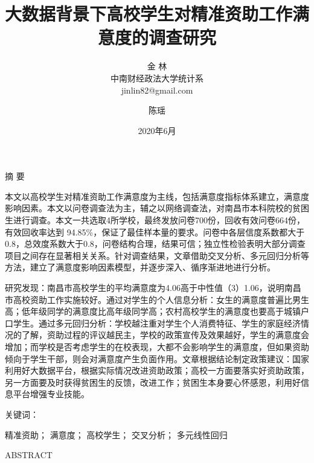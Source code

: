 \documentclass[UTF8,a4paper,12pt]{ctexart}  %
\author{\CJKfamily{kai} 金 \enspace 林 \\ \CJKfamily{kai} 中南财经政法大学统计系 \\ jinlin82@gmail.com}
\title{\LARGE\textbf{大数据背景下高校学生对精准资助工作满意度的调查研究}}
\author{陈瑶}
\date{2020年6月}
\begin{document}
\maketitle






摘 要

本文以高校学生对精准资助工作满意度为主线，包括满意度指标体系建立，满意度影响因素。本文以问卷调查法为主，辅之以网络调查法，对南昌市本科院校的贫困生进行调查。本文一共选取4所学校，最终发放问卷700份，回收有效问卷664份，有效回收率达到 94.85\%，保证了最佳样本量的要求。问卷中各层信度系数都大于0.8，总效度系数大于0.8，问卷结构合理，结果可信；独立性检验表明大部分调查项目之间存在显著相关关系。针对调查结果，文章借助交叉分析、多元回归分析等方法，建立了满意度影响因素模型，并逐步深入、循序渐进地进行分析。

研究发现：南昌市高校学生的平均满意度为4.06高于中性值（3）1.06，说明南昌市高校资助工作实施较好。通过对学生的个人信息分析：女生的满意度普遍比男生高；低年级同学的满意度比高年级同学高；农村高校学生的满意度也要高于城镇户口学生。通过多元回归分析：学校越注重对学生个人消费特征、学生的家庭经济情况的了解，资助过程的评议越民主，学校的政策宣传及效果越好，学生的满意度会增加；而学校是否考虑学生的在校表现，大都不会影响学生的满意度，但如果资助倾向于学生干部，则会对满意度产生负面作用。文章根据结论制定政策建议：国家利用好大数据平台，根据实际情况改进资助政策；高校一方面要落实好资助政策，另一方面要及时获得贫困生的反馈，改进工作；贫困生本身要心怀感恩，利用好信息平台增强专业技能。

关键词：

精准资助； 满意度； 高校学生； 交叉分析； 多元线性回归

ABSTRACT
\end{document}
